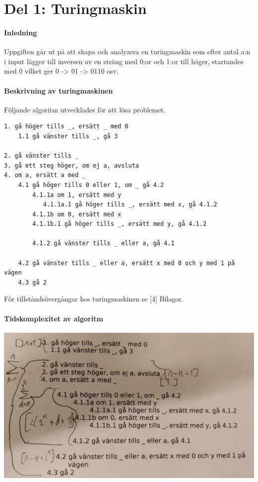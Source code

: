 \section{Del 1: Turingmaskin}
\paragraph{Inledning}    
Uppgiften går ut på att skapa och analyzera en turingmaskin som efter antal a:n i input lägger till inversen av en sträng med 0:or och 1:or till höger, startandes med 0 vilket ger 0 -> 01 -> 0110 osv.

\paragraph{Beskrivning av turingmaskinen}
Följande algoritm utvecklades för att lösa problemet.
\begin{verbatim}
1. gå höger tills _, ersätt _ med 0 
    1.1 gå vänster tills _, gå 3

2. gå vänster tills _
3. gå ett steg höger, om ej a, avsluta 
4. om a, ersätt a med _ 
    4.1 gå höger tills 0 eller 1, om _ gå 4.2 
        4.1.1a om 1, ersätt med y   
           4.1.1a.1 gå höger tills _, ersätt med x, gå 4.1.2  
        4.1.1b om 0, ersätt med x 
        4.1.1b.1 gå höger tills _, ersätt med y, gå 4.1.2 

        4.1.2 gå vänster tills _ eller a, gå 4.1  
    
    4.2 gå vänster tills _ eller a, ersätt x med 0 och y med 1 på vägen 
    4.3 gå 2
\end{verbatim}
För tillståndsövergångar hos turingmaskinen se [4] Bilagor.
\newpage
\paragraph{Tidskomplexitet av algoritm}

\begin{center}
    \includegraphics[width=\linewidth]{bilder/komplexitet_analys.jpg}
\end{center}

